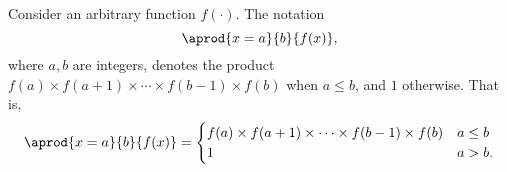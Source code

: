 \begin{note}
  Consider an arbitrary function $f(\cdot)$. The notation
  $$\aprod{x = a}{b}{f(x)},$$
  where $a, b$ are integers,
  denotes the product $f(a) \times f(a + 1) \times \cdots \times f(b - 1) \times f(b)$
  when $a \le b$, and $1$ otherwise. That is,
  $$\aprod{x = a}{b}{f(x)} = 
  \begin{cases}
    f(a) \times f(a + 1) \times \cdots \times f(b - 1) \times f(b) & a \le b\\
    1 & a > b.
  \end{cases}$$%
\end{note}
